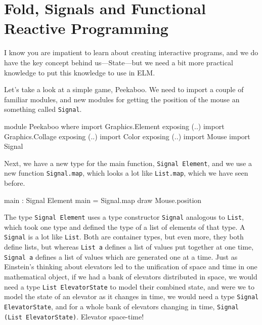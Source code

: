\documentclass[12pt]{amsbook}
\begin{document}
\chapter{Fold, Signals and Functional Reactive Programming}
%
I know you are impatient to learn about creating interactive programs,
and we do have the key concept behind us---State---but we need a bit
more practical knowledge to put this knowledge to use in ELM.

Let's take a look at a simple game, Peekaboo.
We need to import a couple of familiar modules,
and new modules for getting the position of the 
mouse an something called \texttt{Signal}.
\begin{code}
module Peekaboo where
import Graphics.Element exposing (..)
import Graphics.Collage exposing (..)
import Color exposing (..)
import Mouse
import Signal
\end{code}
Next, we have a new type for the main function, \texttt{Signal Element},
and we use a new function \texttt{Signal.map},
which looks a lot like \texttt{List.map}, which we have seen before.
\begin{code}
main : Signal Element
main =
  Signal.map draw Mouse.position
\end{code}
The type \texttt{Signal Element} uses a type constructor \texttt{Signal}
analogous to \texttt{List}, which took one type and defined the type of
a list of elements of that type.
A \texttt{Signal} is a lot like \texttt{List}.
Both are container types, but even more, they both define lists,
but whereas \texttt{List a} defines a list of values put together at one time,
\texttt{Signal a} defines a list of values which are generated one at a time.
Just as Einstein's thinking about elevators led to the unification of space and time in one mathematical object, 
if we had a bank of elevators distributed in space,
we would need a type \texttt{List ElevatorState} to model their combined state,
and were we to model the state of an elevator as it changes in time, we would need a type 
\texttt{Signal ElevatorState}, and for a whole bank of elevators changing in time,
\texttt{Signal (List ElevatorState)}.
Elevator space-time!
\end{document}
